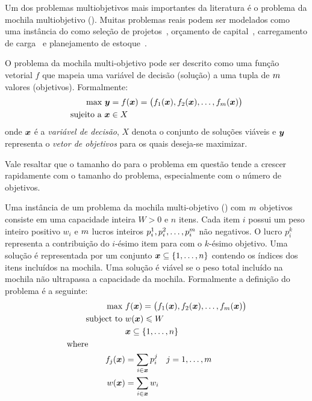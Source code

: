 
Um dos problemas multiobjetivos mais importantes da literatura
é o problema da mochila multiobjetivo (\mokp{}).
Muitas problemas reais podem ser modelados como uma instância do \mokp{}
como seleção de projetos~\cite{teng1996multiobjective},
orçamento de capital~\cite{rosenblatt1989generating},
carregamento de carga~\cite{teng1996multiobjective}
e planejamento de estoque~\cite{ishibuchi2015behavior}.


O problema da mochila multi-objetivo pode ser descrito como uma função vetorial
$f$ que mapeia uma variável de decisão (solução) a uma tupla de $m$ valores
(objetivos).
Formalmente:
\begin{align*}
  \text{max} ~ \boldsymbol{y} &= f(\boldsymbol{x}) =
    \big(f_1(\boldsymbol{x})
    ,f_2(\boldsymbol{x})
    ,\ldots
    ,f_{m}(\boldsymbol{x})\big) \\
  \text{sujeito a} ~ \boldsymbol{x} & \in X
\end{align*}
onde $\boldsymbol{x}$ é a \emph{variável de decisão}, $X$ denota o conjunto de
soluções viáveis e $\boldsymbol{y}$ representa o \emph{vetor de objetivos} para os quais
deseja-se maximizar.


Vale resaltar que o tamanho do \paretoset para o problema em questão
tende a crescer rapidamente com o tamanho do problema, especialmente com o
número de objetivos.

Uma instância de um problema da mochila multi-objetivo (\mokp{}) com $m$
objetivos consiste em uma capacidade inteira $W >0$ e $n$ itens.
Cada item $i$ possui um peso inteiro positivo $w_i$ e $m$ lucros inteiros
$p_i^1, p_i^2, \ldots, p_{i}^{m}$ não negativos.
O lucro $p_i^k$ representa a contribuição do $i$-ésimo item
para com o $k$-ésimo objetivo.
Uma solução é representada por um conjunto $\boldsymbol{x} \subseteq \{1, \ldots, n\}$
contendo os índices dos itens incluídos na mochila.
Uma solução é viável se o peso total incluído na mochila não ultrapassa
a capacidade da mochila.
Formalmente a definição do problema é a seguinte:
\begin{align*}
  \text{max   } & f(\boldsymbol{x}) =
    \big(f_1(\boldsymbol{x}) ,f_2(\boldsymbol{x}) ,\ldots ,f_{m}(\boldsymbol{x})\big) \\
  \text{subject to   } & w(\boldsymbol{x}) \leqslant W \\
  & \boldsymbol{x} \subseteq \{1, \ldots, n\}\\
  \text{where} \phantom{mmmmm} \\
  f_j(\boldsymbol{x}) &= \sum_{i \in \boldsymbol{x}} p^j_i \quad j = 1, \ldots, m\\
  w(\boldsymbol{x}) &= \sum_{i \in \boldsymbol{x}} w_i
\end{align*}


